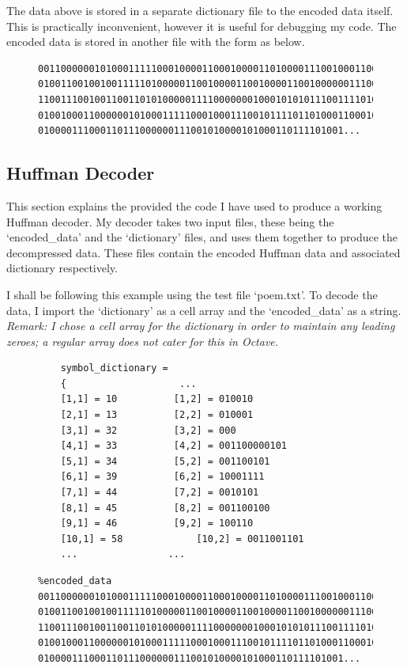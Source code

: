 \documentclass[12pt]{article}
\begin{document}
The data above is stored in a separate dictionary file to the encoded data itself. This is practically inconvenient, however it is useful for debugging my code. The encoded data is stored in another file with the form as below.

\begin{figure}[H]
\begin{verbatim}
001100000010100011111000100001100010000110100001110010001100000110001000011
010011001001001111101000001100100001100100001100100000011100000100101000100
110011100100110011010100000111100000001000101010111001111010001010010010001
010010001100000010100011111000100011100101111011010001100010000110111100100
010000111000110111000000111001010000101000110111101001...
\end{verbatim}
\end{figure}

\subsection{Huffman Decoder}{\label{sec_huff_decoder}}

This section explains the provided the code I have used to produce a working Huffman decoder. My decoder takes two input files, these being the `encoded\_data' and the `dictionary' files, and uses them together to produce the decompressed data. These files contain the encoded Huffman data and associated dictionary respectively.

I shall be following this example using the test file `poem.txt'. To decode the data, I import the `dictionary' as a cell array and the `encoded\_data' as a string. \emph{Remark: I chose a cell array for the dictionary in order to maintain any leading zeroes; a regular array does not cater for this in Octave.}

\begin{figure}[H]
	\begin{verbatim}
	symbol_dictionary =
	{			         ...
	[1,1] = 10			[1,2] = 010010
	[2,1] = 13			[2,2] = 010001
	[3,1] = 32			[3,2] = 000
	[4,1] = 33			[4,2] = 001100000101
	[5,1] = 34			[5,2] = 001100101
	[6,1] = 39			[6,2] = 10001111
	[7,1] = 44			[7,2] = 0010101
	[8,1] = 45			[8,2] = 001100100
	[9,1] = 46			[9,2] = 100110
	[10,1] = 58       		[10,2] = 0011001101
	...			       ...
	\end{verbatim}
\end{figure}

\begin{figure}[H]
\begin{verbatim}
%encoded_data
001100000010100011111000100001100010000110100001110010001100000110001000011
010011001001001111101000001100100001100100001100100000011100000100101000100
110011100100110011010100000111100000001000101010111001111010001010010010001
010010001100000010100011111000100011100101111011010001100010000110111100100
010000111000110111000000111001010000101000110111101001...
\end{verbatim}
\end{figure}
\end{document}
